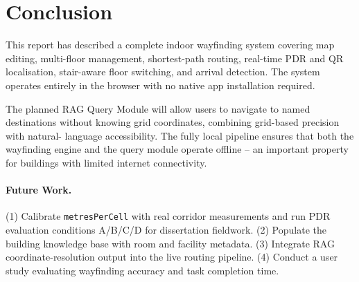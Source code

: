 \documentclass[12pt,a4paper]{article}
\begin{document}
\section{Conclusion}
\label{sec:conclusion}

This report has described a complete indoor wayfinding system covering map
editing, multi-floor management, shortest-path routing, real-time PDR and QR
localisation, stair-aware floor switching, and arrival detection. The system
operates entirely in the browser with no native app installation required.

The planned RAG Query Module will allow users to navigate to named destinations
without knowing grid coordinates, combining grid-based precision with natural-
language accessibility. The fully local pipeline ensures that both the
wayfinding engine and the query module operate offline -- an important property
for buildings with limited internet connectivity.

\paragraph{Future Work.}
(1) Calibrate \texttt{metresPerCell} with real corridor measurements and run
PDR evaluation conditions A/B/C/D for dissertation fieldwork.
(2) Populate the building knowledge base with room and facility metadata.
(3) Integrate RAG coordinate-resolution output into the live routing pipeline.
(4) Conduct a user study evaluating wayfinding accuracy and task completion time.
\end{document}
